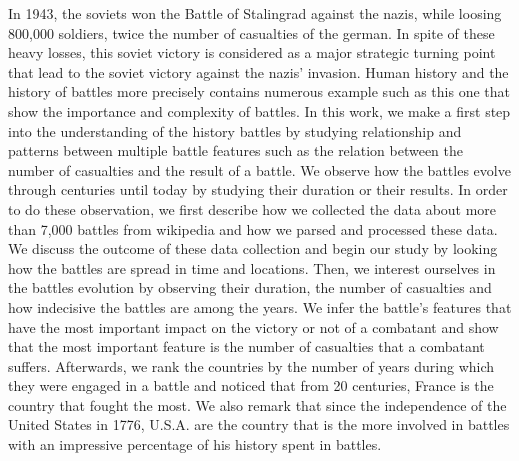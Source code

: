 In 1943, the soviets won the Battle of Stalingrad against the nazis, while loosing 800,000 soldiers, twice the number of casualties of the german. In spite of these heavy losses, this soviet victory is considered as a major strategic turning point that lead to the soviet victory against the nazis' invasion. Human history and the history of battles more precisely contains numerous example such as this one that show the importance and complexity of battles. In this work, we make a first step into the understanding of the history battles by studying relationship and patterns between multiple battle features such as the relation between the number of casualties and the result of a battle. We observe how the battles evolve through centuries until today by studying their duration or their results. In order to do these observation, we first describe how we collected the data about more than 7,000 battles from wikipedia and how we parsed and processed these data. We discuss the outcome of these data collection and begin our study by looking how the battles are spread in time and locations. Then, we interest ourselves in the battles evolution by observing their duration, the number of casualties and how indecisive the battles are among the years. We infer the battle's features that have the most important impact on the victory or not of a combatant and show that the most important feature is the number of casualties that a combatant suffers. Afterwards, we rank the countries by the number of years during which they were engaged in a battle and noticed that from 20 centuries, France is the country that fought the most. We also remark that since the independence of the United States in 1776, U.S.A. are the country that is the more involved in battles with an impressive percentage of his history spent in battles.
